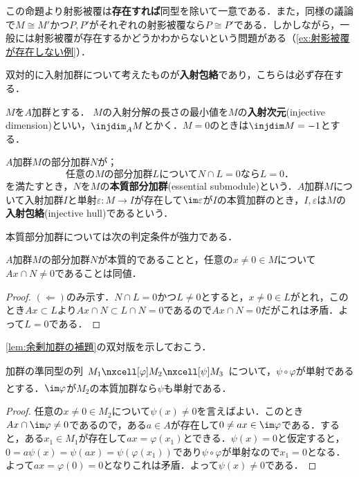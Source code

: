 この命題より射影被覆は\textbf{存在すれば}同型を除いて一意である．また，同様の議論で$M\cong M'$かつ$P,P'$がそれぞれの射影被覆なら$P\cong P'$である．しかしながら，一般には射影被覆が存在するかどうかわからないという問題がある（\ref{ex:射影被覆が存在しない例}）．

双対的に入射加群について考えたものが\textbf{入射包絡}であり，こちらは必ず存在する．
\begin{defi}[入射次元]
	$M$を$A$加群とする． $M$の入射分解の長さの最小値を$M$の\textbf{入射次元}(injective dimension)といい，$\injdim_A M$とかく．$M=0$のときは$\injdim M=-1$とする．
\end{defi}

\begin{defi}[入射包絡]
	$A$加群$M$の部分加群$N$が；
	\[\text{任意の$M$の部分加群$L$について$N\cap L=0$なら$L=0$．}\]
	を満たすとき，$N$を$M$の\textbf{本質部分加群}(essential submodule)という．$A$加群$M$について入射加群$I$と単射$\varepsilon:M\to I$が存在して$\im\varepsilon$が$I$の本質加群のとき，$I,\varepsilon$は$M$の\textbf{入射包絡}(injective hull)であるという．
\end{defi}

本質部分加群については次の判定条件が強力である．
\begin{prop}\label{prop:本質的加群の判定条件}
	$A$加群$M$の部分加群$N$が本質的であることと，任意の$x\neq0\in M$について$Ax\cap N\neq0$であることは同値．
\end{prop}

\begin{proof}
	$(\Longleftarrow)$のみ示す．$N\cap L=0$かつ$L\neq0$とすると，$x\neq0\in L$がとれ，このとき$Ax\subset L$より$Ax\cap N\subset L\cap N=0$であるので$Ax\cap N=0$だがこれは矛盾．よって$L=0$である．
\end{proof}

\ref{lem:余剰加群の補題}の双対版を示しておこう．

\begin{lem}
	加群の準同型の列$\begin{tikzcd}
	M_1\nxcell[\varphi]M_2\nxcell[\psi]M_3
	\end{tikzcd}$について，$\psi\circ\varphi$が単射であるとする．$\im\varphi$が$M_2$の本質加群なら$\psi$も単射である．
\end{lem}

\begin{proof}
	任意の$x\neq0\in M_2$について$\psi(x)\neq0$を言えばよい．このとき$Ax\cap\im\varphi\neq0$であるので，ある$a\in A$が存在して$0\neq ax\in\im\varphi$である．すると，ある$x_1\in M_1$が存在して$ax=\varphi(x_1)$とできる．$\psi(x)=0$と仮定すると，$0=a\psi(x)=\psi(ax)=\psi(\varphi(x_1))$であり$\psi\circ\varphi$が単射なので$x_1=0$となる．よって$ax=\varphi(0)=0$となりこれは矛盾．よって$\psi(x)\neq0$である．
\end{proof}

